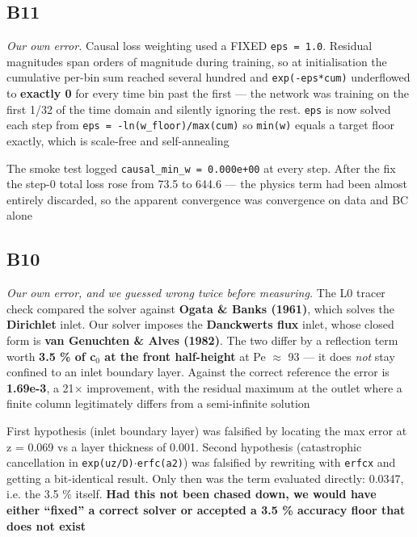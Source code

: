 \documentclass[10pt]{article}
\begin{document}
\subsection*{B11}\label{led:B11}
\begin{description}[leftmargin=0pt,itemsep=1pt]
\item[Defect.] \emph{Our own error.} Causal loss weighting used a FIXED \texttt{eps = 1.0}. Residual magnitudes span orders of magnitude during training, so at initialisation the cumulative per-bin sum reached several hundred and \texttt{exp(-eps*cum)} underflowed to \textbf{exactly 0} for every time bin past the first --- the network was training on the first 1/32 of the time domain and silently ignoring the rest. \texttt{eps} is now solved each step from \texttt{eps = -ln(w\_floor)/max(cum)} so \texttt{min(w)} equals a target floor exactly, which is scale-free and self-annealing
\item[How it was caught.] The smoke test logged \texttt{causal\_min\_w = 0.000e+00} at every step. After the fix the step-0 total loss rose from 73.5 to 644.6 --- the physics term had been almost entirely discarded, so the apparent convergence was convergence on data and BC alone
\end{description}
\subsection*{B10}\label{led:B10}
\begin{description}[leftmargin=0pt,itemsep=1pt]
\item[Defect.] \emph{Our own error, and we guessed wrong twice before measuring.} The L0 tracer check compared the solver against \textbf{Ogata \& Banks (1961)}, which solves the \textbf{Dirichlet} inlet. Our solver imposes the \textbf{Danckwerts flux} inlet, whose closed form is \textbf{van Genuchten \& Alves (1982)}. The two differ by a reflection term worth \textbf{3.5 \% of c$_0$ at the front half-height} at Pe $\approx$ 93 --- it does \emph{not} stay confined to an inlet boundary layer. Against the correct reference the error is \textbf{1.69e-3}, a 21$\times$ improvement, with the residual maximum at the outlet where a finite column legitimately differs from a semi-infinite solution
\item[How it was caught.] First hypothesis (inlet boundary layer) was falsified by locating the max error at z = 0.069 vs a layer thickness of 0.001. Second hypothesis (catastrophic cancellation in \texttt{exp(uz/D)$\cdot$erfc(a2)}) was falsified by rewriting with \texttt{erfcx} and getting a bit-identical result. Only then was the term evaluated directly: 0.0347, i.e. the 3.5 \% itself. \textbf{Had this not been chased down, we would have either ``fixed'' a correct solver or accepted a 3.5 \% accuracy floor that does not exist}
\end{description}
\end{document}

